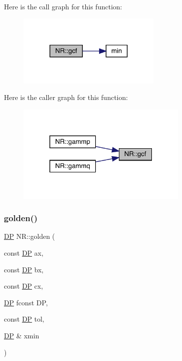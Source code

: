 Here is the call graph for this function\+:
\nopagebreak
\begin{figure}[H]
\begin{center}
\leavevmode
\includegraphics[width=197pt]{da/d46/namespaceNR_a54a09ab3536295080e52c4deb5cc42c5_cgraph}
\end{center}
\end{figure}
Here is the caller graph for this function\+:
\nopagebreak
\begin{figure}[H]
\begin{center}
\leavevmode
\includegraphics[width=235pt]{da/d46/namespaceNR_a54a09ab3536295080e52c4deb5cc42c5_icgraph}
\end{center}
\end{figure}
\mbox{\label{namespaceNR_a0fb02a1e4932c1918d2a75bdcfec27cd}} 
\subsubsection{\texorpdfstring{golden()}{golden()}}
{\footnotesize\ttfamily \mbox{\hyperlink{namespaceNR_af6ff762dd605ff477b8e52387253a02a}{DP}} N\+R\+::golden (\begin{DoxyParamCaption}\item[{const \mbox{\hyperlink{namespaceNR_af6ff762dd605ff477b8e52387253a02a}{DP}}}]{ax,  }\item[{const \mbox{\hyperlink{namespaceNR_af6ff762dd605ff477b8e52387253a02a}{DP}}}]{bx,  }\item[{const \mbox{\hyperlink{namespaceNR_af6ff762dd605ff477b8e52387253a02a}{DP}}}]{cx,  }\item[{\mbox{\hyperlink{namespaceNR_af6ff762dd605ff477b8e52387253a02a}{DP}} }]{fconst DP,  }\item[{const \mbox{\hyperlink{namespaceNR_af6ff762dd605ff477b8e52387253a02a}{DP}}}]{tol,  }\item[{\mbox{\hyperlink{namespaceNR_af6ff762dd605ff477b8e52387253a02a}{DP}} \&}]{xmin }\end{DoxyParamCaption})}

